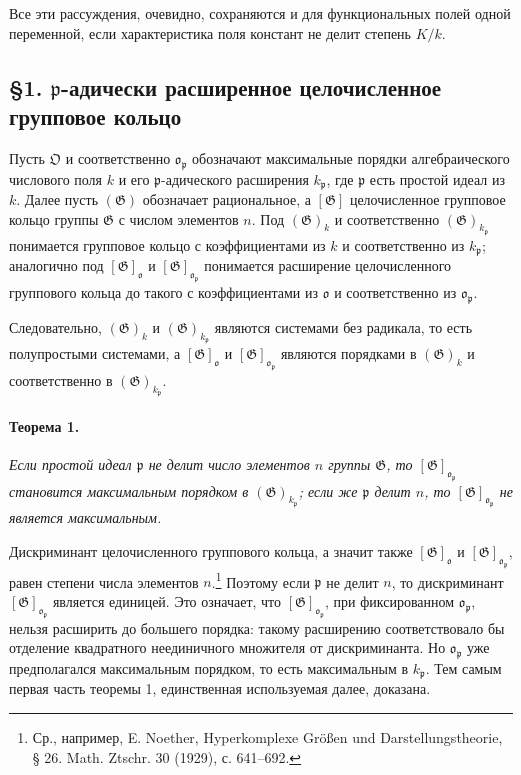 \documentclass[11pt]{article}
\providecommand{\frakO}{\mathfrak{O}}
\providecommand{\frako}{\mathfrak{o}}
\providecommand{\frakp}{\mathfrak{p}}
\providecommand{\Gg}{\mathfrak{G}}
\begin{document}
Все эти рассуждения, очевидно, сохраняются и для функциональных полей одной переменной, если характеристика поля констант не делит степень \(K/k\).

\subsection*{§1. \(\frakp\)-адически расширенное целочисленное групповое кольцо}

Пусть \(\frakO\) и соответственно \(\frako_\frakp\) обозначают максимальные порядки алгебраического числового поля \(k\) и его \(\frakp\)-адического расширения \(k_\frakp\), где \(\frakp\) есть простой идеал из \(k\). Далее пусть \((\Gg)\) обозначает рациональное, а \([\Gg]\) целочисленное групповое кольцо группы \(\Gg\) с числом элементов \(n\). Под \((\Gg)_k\) и соответственно \((\Gg)_{k_\frakp}\) понимается групповое кольцо с коэффициентами из \(k\) и соответственно из \(k_\frakp\); аналогично под \([\Gg]_\frako\) и \([\Gg]_{\frako_\frakp}\) понимается расширение целочисленного группового кольца до такого с коэффициентами из \(\frako\) и соответственно из \(\frako_\frakp\).

Следовательно, \((\Gg)_k\) и \((\Gg)_{k_\frakp}\) являются системами без радикала, то есть полупростыми системами, а \([\Gg]_\frako\) и \([\Gg]_{\frako_\frakp}\) являются порядками в \((\Gg)_k\) и соответственно в \((\Gg)_{k_\frakp}\).

\paragraph{Теорема 1.}
\emph{Если простой идеал \(\frakp\) не делит число элементов \(n\) группы \(\Gg\), то \([\Gg]_{\frako_\frakp}\) становится максимальным порядком в \((\Gg)_{k_\frakp}\); если же \(\frakp\) делит \(n\), то \([\Gg]_{\frako_\frakp}\) не является максимальным.}

Дискриминант целочисленного группового кольца, а значит также \([\Gg]_\frako\) и \([\Gg]_{\frako_\frakp}\), равен степени числа элементов \(n\).\footnote{Ср., например, E. Noether, Hyperkomplexe Größen und Darstellungstheorie, § 26. Math. Ztschr. 30 (1929), с. 641--692.} Поэтому если \(\frakp\) не делит \(n\), то дискриминант \([\Gg]_{\frako_\frakp}\) является единицей. Это означает, что \([\Gg]_{\frako_\frakp}\), при фиксированном \(\frako_\frakp\), нельзя расширить до большего порядка: такому расширению соответствовало бы отделение квадратного неединичного множителя от дискриминанта. Но \(\frako_\frakp\) уже предполагался максимальным порядком, то есть максимальным в \(k_\frakp\). Тем самым первая часть теоремы 1, единственная используемая далее, доказана.
\end{document}

